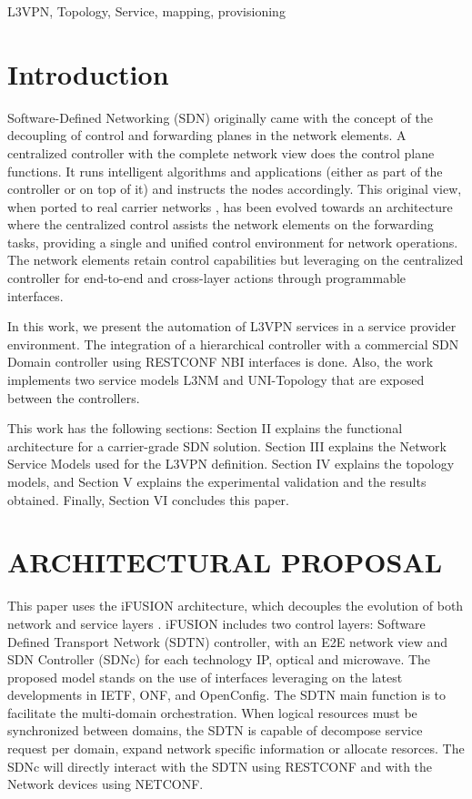 \documentclass[conference]{IEEEtran}
\begin{document}
\begin{IEEEkeywords}
L3VPN, Topology, Service, mapping, provisioning
\end{IEEEkeywords}

\section{Introduction}
Software-Defined Networking (SDN) originally \cite{b1} came with the concept of the decoupling of control and forwarding planes in the network elements.
A centralized controller with the complete network view does the control plane functions. 
It runs intelligent algorithms and applications (either as part of the controller or on top of it) and instructs the nodes accordingly. 
This original view, when ported to real carrier networks \cite{b2}, has been evolved towards an architecture where the centralized control assists the network elements on the forwarding tasks, providing a single and unified control environment for network operations. 
The network elements retain control capabilities but leveraging on the centralized controller for end-to-end and cross-layer actions through programmable interfaces. 

In this work, we present the automation of L3VPN services in a service provider environment. 
The integration of a hierarchical controller with a commercial SDN Domain controller using RESTCONF NBI interfaces is done.
Also, the work implements two service models L3NM \cite{b3} and UNI-Topology \cite{b4} that are exposed between the controllers. 

This work has the following sections: Section II explains the functional architecture for a carrier-grade SDN solution. Section III explains the Network Service Models used for the L3VPN definition. Section IV explains the topology models, and Section V explains the experimental validation and the results obtained. Finally, Section VI concludes this paper.

\section{ARCHITECTURAL PROPOSAL}

This paper uses the iFUSION architecture, which decouples the evolution of both network and service layers \cite{b2}. iFUSION includes two control layers: Software Defined Transport Network (SDTN) controller, with an E2E network view and SDN Controller (SDNc) for each technology IP, optical and microwave. The proposed model stands on the use of interfaces leveraging on the latest developments in IETF, ONF, and OpenConfig.
The SDTN main function is to facilitate the multi-domain orchestration.
When logical resources must be synchronized between domains, the SDTN is capable of decompose service request per domain, expand network specific information or allocate resorces. 
The SDNc will directly interact with the SDTN using RESTCONF and with the Network devices using NETCONF. 
\end{document}
